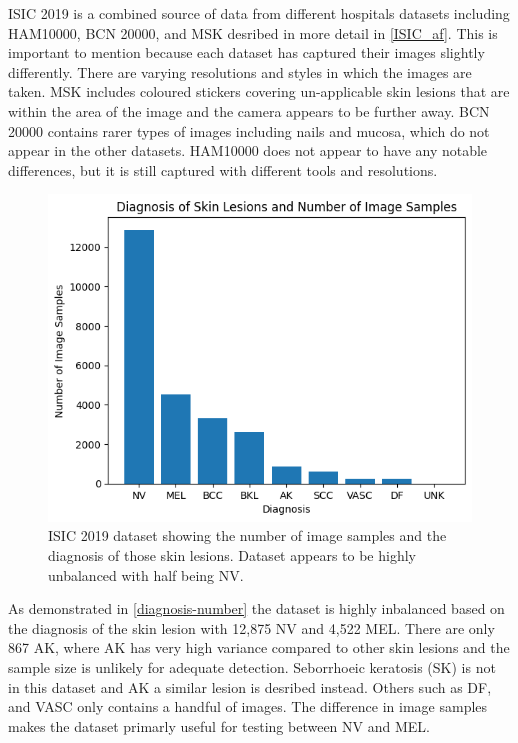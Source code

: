 ISIC 2019 is a combined source of data from different hospitals datasets including HAM10000, BCN 20000, and MSK desribed in more detail in \ref{ISIC_af}. This is important to mention because each dataset has captured their images slightly differently. There are varying resolutions and styles in which the images are taken. MSK includes coloured stickers covering un-applicable skin lesions that are within the area of the image and the camera appears to be further away. BCN 20000 contains rarer types of images including nails and mucosa, which do not appear in the other datasets. HAM10000 does not appear to have any notable differences, but it is still captured with different tools and resolutions.

\begin{figure}
	\centering
	\includegraphics[scale=0.8]{images/ISIC/diagnosis-number.png}
	\caption{ISIC 2019 dataset showing the number of image samples and the diagnosis of those skin lesions. Dataset appears to be highly unbalanced with half being NV.} 
\end{figure} \label{diagnosis-number}
	
As demonstrated in \ref{diagnosis-number} the dataset is highly inbalanced based on the diagnosis of the skin lesion with 12,875 NV and 4,522 MEL. There are only 867 AK, where AK has very high variance compared to other skin lesions and the sample size is unlikely for adequate detection. Seborrhoeic keratosis (SK) is not in this dataset and AK a similar lesion is desribed instead. Others such as DF, and VASC only contains a handful of images. The difference in image samples makes the dataset primarly useful for testing between NV and MEL.

